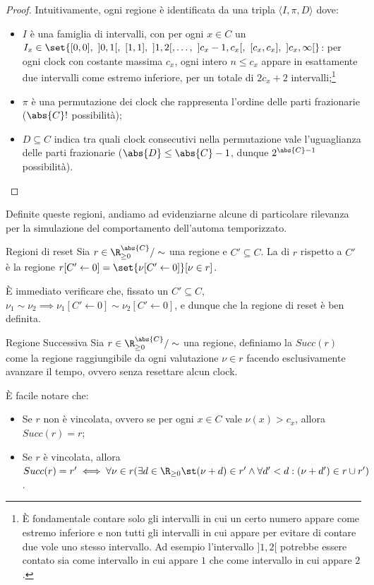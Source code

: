 \begin{proof}
  Intuitivamente, ogni regione è identificata da una tripla \(\langle I, \pi, D \rangle\) dove:
  \begin{itemize}
    \item \(I\) è una famiglia di intervalli, con per ogni \(x \in C\) un \(I_x \in \set{[0,0],\ ]0,1[,\ [1,1],\ ]1,2[,\ldots,\ ]c_x-1,c_x[,\ [c_x,c_x],\ ]c_x,\infty[}\): per ogni clock con costante massima \(c_x\), ogni intero \(n \leq c_x\) appare in esattamente due intervalli come estremo inferiore, per un totale di \(2c_x+2\) intervalli;\footnote{È fondamentale contare solo gli intervalli in cui un certo numero appare come estremo inferiore e non tutti gli intervalli in cui appare per evitare di contare due vole uno stesso intervallo. Ad esempio l'intervallo \(]1,2[\) potrebbe essere contato sia come intervallo in cui appare \(1\) che come intervallo in cui appare \(2\).}
    \item \(\pi\) è una permutazione dei clock che rappresenta l'ordine delle parti frazionarie (\(\abs{C}!\) possibilità);
    \item \(D\subseteq C\) indica tra quali clock consecutivi nella permutazione vale l'uguaglianza delle parti frazionarie (\(\abs{D}\leq\abs{C}-1\), dunque \(2^{\abs{C}-1}\) possibilità).
  \end{itemize}
\end{proof}

Definite queste regioni, andiamo ad evidenziarne alcune di particolare rilevanza per la simulazione del comportamento dell'automa temporizzato.

\begin{definition}{Regioni di reset}
  Sia \(r \in \R_{\geq 0}^{\abs{C}}/\sim\) una regione e \(C' \subseteq C\). La  di \(r\) rispetto a \(C'\) è la regione \(r[C' \gets 0] = \set{\nu[C'\gets 0]}[\nu \in r]\).

  È immediato verificare che, fissato un \(C'\subseteq C\), \(\nu_1 \sim \nu_2 \implies \nu_1[C'\gets 0] \sim \nu_2[C'\gets 0]\), e dunque che la regione di reset è ben definita.
\end{definition}

\begin{definition}{Regione Successiva}
  Sia \(r \in \R_{\geq 0}^{\abs{C}}/\sim\) una regione, definiamo la  \(Succ(r)\) come la  regione raggiungibile da ogni valutazione \(\nu \in r\) facendo esclusivamente avanzare il tempo, ovvero senza resettare alcun clock. 
  
  È facile notare che:
  \begin{itemize}
    \item Se \(r\) non è vincolata, ovvero se per ogni \(x \in C\) vale \(\nu(x) > c_x\), allora \(Succ(r) = r\);
    \item Se \(r\) è vincolata, allora \(Succ(r) = r' \iff \forall \nu \in r(\exists d \in \R_{\geq 0}\st (\nu+d)\in r' \land \forall d' < d: (\nu+d') \in r \cup r')\).
  \end{itemize}
\end{definition}

